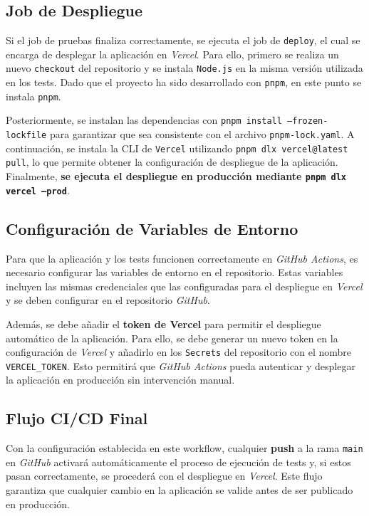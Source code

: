 \subsection*{Job de Despliegue}

Si el job de pruebas finaliza correctamente, se ejecuta el job de \texttt{deploy}, el cual se encarga de desplegar la aplicación en \textit{Vercel}. Para ello, primero se realiza un nuevo \texttt{checkout} del repositorio y se instala \texttt{Node.js} en la misma versión utilizada en los tests. Dado que el proyecto ha sido desarrollado con \texttt{pnpm}, en este punto se instala \texttt{pnpm}.

Posteriormente, se instalan las dependencias con \texttt{pnpm install --frozen-lockfile} para garantizar que sea consistente con el archivo \texttt{pnpm-lock.yaml}. A continuación, se instala la CLI de \texttt{Vercel} utilizando \texttt{pnpm dlx vercel@latest pull}, lo que permite obtener la configuración de despliegue de la aplicación. Finalmente, \textbf{se ejecuta el despliegue en producción mediante \texttt{pnpm dlx vercel --prod}}.

\subsection{Configuración de Variables de Entorno}

Para que la aplicación y los tests funcionen correctamente en \textit{GitHub Actions}, es necesario configurar las variables de entorno en el repositorio. Estas variables incluyen las mismas credenciales que las configuradas para el despliegue en \textit{Vercel} y se deben configurar en el repositorio \textit{GitHub}.

Además, se debe añadir el \textbf{token de Vercel} para permitir el despliegue automático de la aplicación. Para ello, se debe generar un nuevo token en la configuración de \textit{Vercel} y añadirlo en los \texttt{Secrets} del repositorio con el nombre \texttt{VERCEL\_TOKEN}. Esto permitirá que \textit{GitHub Actions} pueda autenticar y desplegar la aplicación en producción sin intervención manual.

\subsection{Flujo CI/CD Final}

Con la configuración establecida en este workflow, cualquier \textbf{push} a la rama \texttt{main} en \textit{GitHub} activará automáticamente el proceso de ejecución de tests y, si estos pasan correctamente, se procederá con el despliegue en \textit{Vercel}. Este flujo garantiza que cualquier cambio en la aplicación se valide antes de ser publicado en producción.


